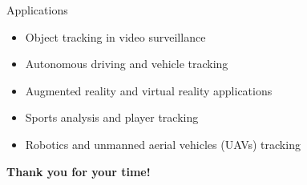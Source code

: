 \documentclass{beamer}
\begin{document}
\begin{frame}{Applications}
\begin{itemize}
\item Object tracking in video surveillance
\item Autonomous driving and vehicle tracking
\item Augmented reality and virtual reality applications
\item Sports analysis and player tracking
\item Robotics and unmanned aerial vehicles (UAVs) tracking
\end{itemize}
\end{frame}

\begin{frame}
\huge \textbf{Thank you for your time!} 
\end{frame}
\end{document}
